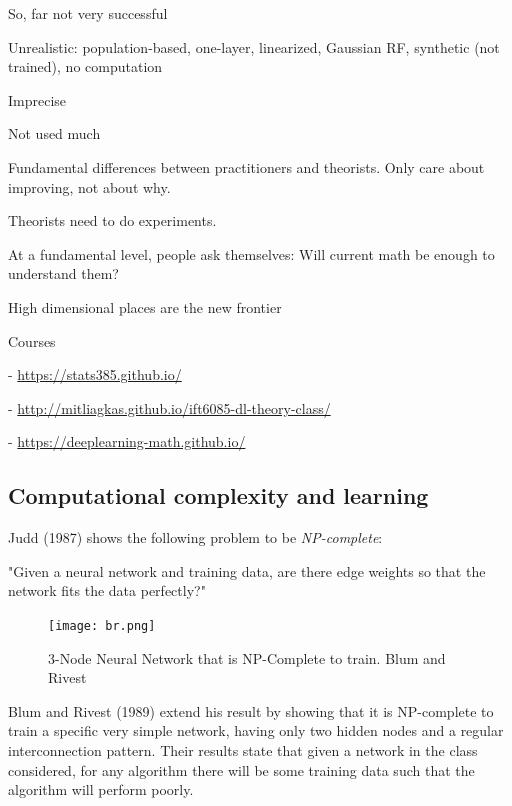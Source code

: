 \documentclass[english]{article}
\begin{document}
\item So, far not very successful
\bitem
\item Unrealistic: population-based, one-layer, linearized, Gaussian RF, synthetic (not trained), no computation
\item Imprecise
\item Not used much
\eitem
\item  Fundamental differences between practitioners and theorists. Only care about improving, not about why. 

\item Theorists need to do experiments. 

\item At a fundamental level, people ask themselves: Will current math be enough to understand them?

High dimensional places are the new frontier

\item Courses

- \url{https://stats385.github.io/}

- \url{http://mitliagkas.github.io/ift6085-dl-theory-class/}

- \url{https://deeplearning-math.github.io/}



\eitem


\subsection{Computational complexity and learning}

\benum 
\item 
Judd (1987) shows the following
problem to be \emph{NP-complete}:


"Given a neural network and training data, are there edge weights so that the network fits the data perfectly?"

\begin{figure}
  \centering
  \texttt{[image: br.png]}
  \caption{3-Node Neural Network that is
NP-Complete to train. Blum and Rivest}
\end{figure}


Blum and Rivest (1989) extend his result by showing that it is NP-complete to train a specific very
simple network, having only two hidden nodes and a regular interconnection
pattern. Their results state that given a network in the class considered, for any
algorithm there will be some training data such that the algorithm
will perform poorly.
\end{document}
